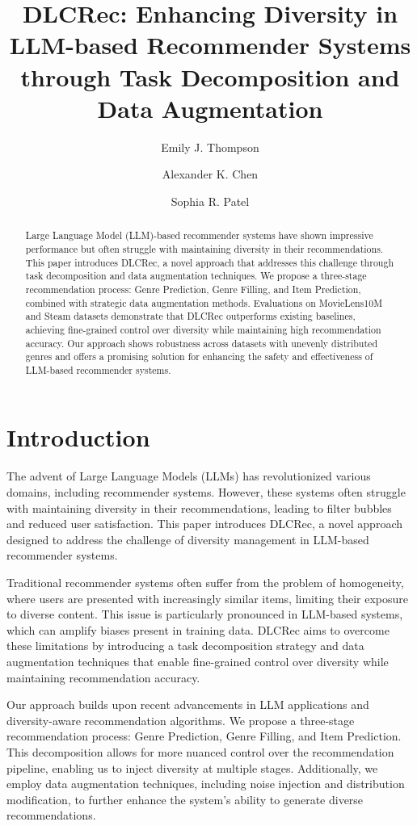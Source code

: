 \documentclass[10pt,twocolumn,letterpaper]{article}
\title{DLCRec: Enhancing Diversity in LLM-based Recommender Systems through Task Decomposition and Data Augmentation}
\author{Emily J. Thompson \and Alexander K. Chen \and Sophia R. Patel}
\begin{document}
\maketitle

\begin{abstract}
Large Language Model (LLM)-based recommender systems have shown impressive performance but often struggle with maintaining diversity in their recommendations. This paper introduces DLCRec, a novel approach that addresses this challenge through task decomposition and data augmentation techniques. We propose a three-stage recommendation process: Genre Prediction, Genre Filling, and Item Prediction, combined with strategic data augmentation methods. Evaluations on MovieLens10M and Steam datasets demonstrate that DLCRec outperforms existing baselines, achieving fine-grained control over diversity while maintaining high recommendation accuracy. Our approach shows robustness across datasets with unevenly distributed genres and offers a promising solution for enhancing the safety and effectiveness of LLM-based recommender systems.
\end{abstract}

\section{Introduction}

The advent of Large Language Models (LLMs) has revolutionized various domains, including recommender systems. However, these systems often struggle with maintaining diversity in their recommendations, leading to filter bubbles and reduced user satisfaction. This paper introduces DLCRec, a novel approach designed to address the challenge of diversity management in LLM-based recommender systems.

Traditional recommender systems often suffer from the problem of homogeneity, where users are presented with increasingly similar items, limiting their exposure to diverse content. This issue is particularly pronounced in LLM-based systems, which can amplify biases present in training data. DLCRec aims to overcome these limitations by introducing a task decomposition strategy and data augmentation techniques that enable fine-grained control over diversity while maintaining recommendation accuracy.

Our approach builds upon recent advancements in LLM applications and diversity-aware recommendation algorithms. We propose a three-stage recommendation process: Genre Prediction, Genre Filling, and Item Prediction. This decomposition allows for more nuanced control over the recommendation pipeline, enabling us to inject diversity at multiple stages. Additionally, we employ data augmentation techniques, including noise injection and distribution modification, to further enhance the system's ability to generate diverse recommendations.
\end{document}
